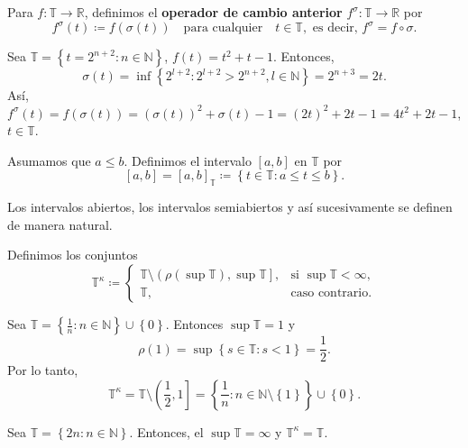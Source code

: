 \begin{frame}
\begin{definition}
Para $f\colon\mathds{T}\rightarrow\mathds{R}$, definimos el \textbf{operador de cambio anterior} $f^{\sigma}\colon\mathds{T}\rightarrow\mathds{R}$ por \[ f^{\sigma}\left(t\right)\coloneqq f\left(\sigma\left(t\right)\right)\quad\text{para cualquier}\quad t\in\mathds{T},\text{ es decir, }f^{\sigma}=f\circ\sigma. \]
\end{definition}

\begin{example}
Sea $\mathds{T}=\left\{t=2^{n+2}:n\in\mathds{N}\right\}$, $f\left(t\right)=t^{2}+t-1$. Entonces, \[ \sigma\left(t\right)=\inf\left\{2^{l+2}:2^{l+2}>2^{n+2}, l\in\mathds{N}\right\}=2^{n+3}=2t. \] Así, $f^{\sigma}\left(t\right)=f\left(\sigma\left(t\right)\right)={\left(\sigma\left(t\right)\right)}^{2}+\sigma\left(t\right)-1={\left(2t\right)}^{2}+2t-1=4t^{2}+2t-1$, $t\in\mathds{T}$.
\end{example}

\begin{definition}
Asumamos que $a\leq b$. Definimos el intervalo $\left[a,b\right]$ en $\mathds{T}$ por \[ \left[a,b\right]={\left[a,b\right]}_{\mathds{T}}\coloneqq\left\{t\in\mathds{T}:a\leq t\leq b\right\}. \]
\end{definition}

\begin{remark}
Los intervalos abiertos, los intervalos semiabiertos y así sucesivamente se definen de manera natural.
\end{remark}
\end{frame}

\begin{frame}
\begin{definition}
Definimos los conjuntos \[ \mathds{T}^{\kappa}\coloneqq\begin{cases}\mathds{T}\setminus\left(\rho\left(\sup\mathds{T}\right),\sup\mathds{T}\right],&\text{si }\sup\mathds{T}<\infty,\\\mathds{T},&\text{caso contrario}.\end{cases} \]
\end{definition}

\begin{example}
Sea $\mathds{T}=\left\{\frac{1}{n}:n\in\mathds{N}\right\}\cup\left\{0\right\}$. Entonces $\sup\mathds{T}=1$ y \[ \rho\left(1\right)=\sup\left\{s\in\mathds{T}:s<1\right\}=\frac{1}{2}. \] Por lo tanto, \[ \mathds{T}^{\kappa}=\mathds{T}\setminus\left(\frac{1}{2},1\right]=\left\{\frac{1}{n}:n\in\mathds{N}\setminus\left\{1\right\}\right\}\cup\left\{0\right\}. \]
\end{example}

\begin{example}
Sea $\mathds{T}=\left\{2n:n\in\mathds{N}\right\}$. Entonces, el $\sup\mathds{T}=\infty$ y $\mathds{T}^{\kappa}=\mathds{T}$.
\end{example}
\end{frame}

